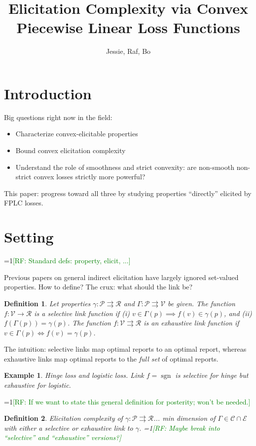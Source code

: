 \documentclass[11pt]{article}
\title{Elicitation Complexity via Convex Piecewise Linear Loss Functions}
\author{Jessie, Raf, Bo}
\newcommand{\Comments}{1}
\newcommand{\mynote}[2]{\ifnum\Comments=1\textcolor{#1}{#2}\fi}
\newcommand{\raf}[1]{\mynote{green}{[RF: #1]}}
\renewcommand{\P}{\mathcal{P}}
\newcommand{\R}{\mathcal{R}}
\newcommand{\V}{\mathcal{V}}
\newcommand{\toto}{\rightrightarrows}
\DeclareMathOperator*{\sgn}{sgn}
\newtheorem{definition}{Definition}
\newtheorem{example}{Example}
\begin{document}
\maketitle

\section{Introduction}
Big questions right now in the field:
\begin{itemize}
\item Characterize convex-elicitable properties
\item Bound convex elicitation complexity
\item Understand the role of smoothness and strict convexity: are non-smooth non-strict convex losses strictly more powerful?
\end{itemize}

This paper: progress toward all three by studying properties ``directly'' elicited by FPLC losses.

\section{Setting}

\raf{Standard defs: property, elicit, ...}

Previous papers on general indirect elicitation have largely ignored set-valued properties.
How to define?
The crux: what should the link be?

\begin{definition}
  Let properties $\gamma:\P\toto\R$ and $\Gamma:\P\toto\V$ be given.
  The function $f:\V\to\R$ is a \emph{selective link function} if (i) $v\in\Gamma(p) \implies f(v) \in \gamma(p)$, and (ii) $f(\Gamma(p)) = \gamma(p)$.
  The function $f:\V\toto\R$ is an \emph{exhaustive link function} if $v\in\Gamma(p) \iff f(v) = \gamma(p)$.
\end{definition}

The intuition: selective links map optimal reports to an optimal report, whereas exhaustive links map optimal reports to the \emph{full set} of optimal reports.

\begin{example}
  Hinge loss and logistic loss.
  Link $f = \sgn$ is selective for hinge but exhaustive for logistic.
\end{example}

\raf{If we want to state this general definition for posterity; won't be needed.}
\begin{definition}
  Elicitation complexity of $\gamma:\P\toto\R$... min dimension of $\Gamma\in\mathcal{C}\cap\mathcal{E}$ with either a selective or exhaustive link to $\gamma$.
  \raf{Maybe break into ``selective'' and ``exhaustive'' versions?}
\end{definition}
\end{document}
